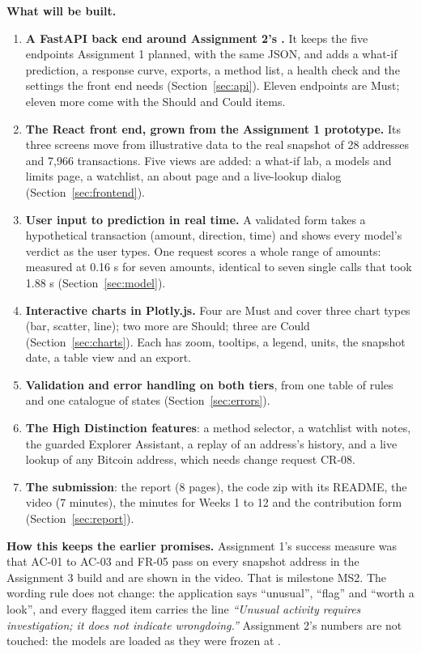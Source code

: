 \textbf{What will be built.}
\begin{enumerate}
  \item \textbf{A FastAPI back end around Assignment 2's .} It keeps the five
    endpoints Assignment 1 planned, with the same JSON, and adds a what-if prediction, a response
    curve, exports, a method list, a health check and the settings the front end needs
    (Section~\ref{sec:api}). Eleven endpoints are Must; eleven more come with the Should and Could
    items.
  \item \textbf{The React front end, grown from the Assignment 1 prototype.} Its three screens move
    from illustrative data to the real snapshot of 28 addresses and 7,966 transactions. Five views
    are added: a what-if lab, a models and limits page, a watchlist, an about page and a live-lookup
    dialog (Section~\ref{sec:frontend}).
  \item \textbf{User input to prediction in real time.} A validated form takes a hypothetical
    transaction (amount, direction, time) and shows every model's verdict as the user types. One
    request scores a whole range of amounts: measured at 0.16 s for seven amounts, identical to
    seven single calls that took 1.88 s (Section~\ref{sec:model}).
  \item \textbf{Interactive charts in Plotly.js.} Four are Must and cover three chart types (bar,
    scatter, line); two more are Should; three are Could (Section~\ref{sec:charts}). Each has zoom,
    tooltips, a legend, units, the snapshot date, a table view and an export.
  \item \textbf{Validation and error handling on both tiers}, from one table of rules and one
    catalogue of states (Section~\ref{sec:errors}).
  \item \textbf{The High Distinction features}: a method selector, a watchlist with notes, the
    guarded Explorer Assistant, a replay of an address's history, and a live lookup of any Bitcoin
    address, which needs change request CR-08.
  \item \textbf{The submission}: the report (8 pages), the code zip with its README, the video
    (7 minutes), the minutes for Weeks 1 to 12 and the contribution form (Section~\ref{sec:report}).
\end{enumerate}

\textbf{How this keeps the earlier promises.} Assignment 1's success measure was that AC-01 to
AC-03 and FR-05 pass on every snapshot address in the Assignment 3 build and are shown in the video.
That is milestone MS2. The wording rule does not change: the application says ``unusual'', ``flag''
and ``worth a look'', and every flagged item carries the line \emph{``Unusual activity requires
investigation; it does not indicate wrongdoing.''} Assignment 2's numbers are not touched: the
models are loaded as they were frozen at .

